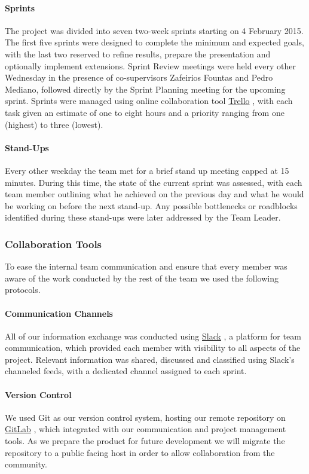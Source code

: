 \documentclass[a4paper,11pt]{article}
\begin{document}
\paragraph{Sprints}
The project was divided into seven two-week sprints starting on 4 February 2015. The first five sprints were designed to complete the minimum and expected goals, with the last two reserved to refine results, prepare the presentation and optionally implement extensions. Sprint Review meetings were held every other Wednesday in the presence of co-supervisors Zafeirios Fountas and Pedro Mediano, followed directly by the Sprint Planning meeting for the upcoming sprint. Sprints were managed using online collaboration tool \href{http://trello.com}{Trello} \cite{trello}, with each task given an estimate of one to eight hours and a priority ranging from one (highest) to three (lowest).

\paragraph{Stand-Ups}
Every other weekday the team met for a brief stand up meeting capped at 15 minutes. During this time, the state of the current sprint was assessed, with each team member outlining what he achieved on the previous day and what he would be working on before the next stand-up. Any possible bottlenecks or roadblocks identified during these stand-ups were later addressed by the Team Leader.

\subsubsection{Collaboration Tools}
To ease the internal team communication and ensure that every member was aware of the work conducted by the rest of the team we used the following protocols.

\paragraph{Communication Channels}
All of our information exchange was conducted using \href{http://slack.com}{Slack} \cite{slack}, a platform for team communication, which provided each member with visibility to all aspects of the project. Relevant information was shared, discussed and classified using Slack's channeled feeds, with a dedicated channel assigned to each sprint.

\paragraph{Version Control}
We used Git as our version control system, hosting our remote repository on \href{http://gitlab.com}{GitLab} \cite{gitlab}, which integrated with our communication and project management tools. As we prepare the product for future development we will migrate the repository to a public facing host in order to allow collaboration from the community.
\end{document}
